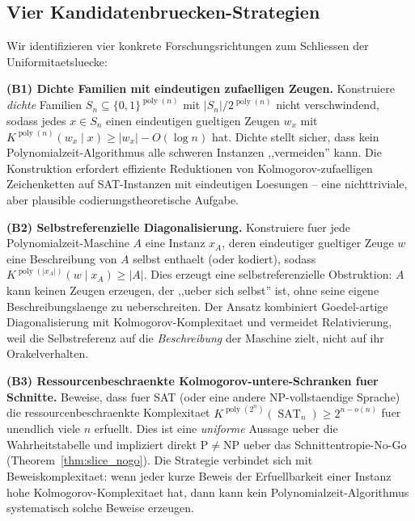 \documentclass[aps,prd,twocolumn,superscriptaddress,nofootinbib]{revtex4-2}
\theoremstyle{definition}
\theoremstyle{remark}
\DeclareMathOperator{\poly}{poly}
\DeclareMathOperator{\SAT}{SAT}
\newcommand{\NP}{\mathrm{NP}}
\newcommand{\PP}{\mathrm{P}}
\begin{document}
\subsection{Vier Kandidatenbruecken-Strategien}

Wir identifizieren vier konkrete Forschungsrichtungen zum Schliessen der Uniformitaetsluecke:

\textbf{(B1) Dichte Familien mit eindeutigen zufaelligen Zeugen.} Konstruiere \textit{dichte} Familien $S_n \subseteq \{0,1\}^{\poly(n)}$ mit $|S_n|/2^{\poly(n)}$ nicht verschwindend, sodass jedes $x \in S_n$ einen eindeutigen gueltigen Zeugen $w_x$ mit $K^{\poly(n)}(w_x \mid x) \geq |w_x| - O(\log n)$ hat. Dichte stellt sicher, dass kein Polynomialzeit-Algorithmus alle schweren Instanzen ,,vermeiden'' kann. Die Konstruktion erfordert effiziente Reduktionen von Kolmogorov-zufaelligen Zeichenketten auf SAT-Instanzen mit eindeutigen Loesungen -- eine nichttriviale, aber plausible codierungstheoretische Aufgabe.

\textbf{(B2) Selbstreferenzielle Diagonalisierung.} Konstruiere fuer jede Polynomialzeit-Maschine $A$ eine Instanz $x_A$, deren eindeutiger gueltiger Zeuge $w$ eine Beschreibung von $A$ selbst enthaelt (oder kodiert), sodass $K^{\poly(|x_A|)}(w \mid x_A) \geq |A|$. Dies erzeugt eine selbstreferenzielle Obstruktion: $A$ kann keinen Zeugen erzeugen, der ,,ueber sich selbst'' ist, ohne seine eigene Beschreibungslaenge zu ueberschreiten. Der Ansatz kombiniert Goedel-artige Diagonalisierung mit Kolmogorov-Komplexitaet und vermeidet Relativierung, weil die Selbstreferenz auf die \textit{Beschreibung} der Maschine zielt, nicht auf ihr Orakelverhalten.

\textbf{(B3) Ressourcenbeschraenkte Kolmogorov-untere-Schranken fuer Schnitte.} Beweise, dass fuer SAT (oder eine andere NP-vollstaendige Sprache) die ressourcenbeschraenkte Komplexitaet $K^{\poly(2^n)}(\SAT_n) \geq 2^{n-o(n)}$ fuer unendlich viele $n$ erfuellt. Dies ist eine \textit{uniforme} Aussage ueber die Wahrheitstabelle und impliziert direkt $\PP \neq \NP$ ueber das Schnittentropie-No-Go (Theorem~\ref{thm:slice_nogo}). Die Strategie verbindet sich mit Beweiskomplexitaet: wenn jeder kurze Beweis der Erfuellbarkeit einer Instanz hohe Kolmogorov-Komplexitaet hat, dann kann kein Polynomialzeit-Algorithmus systematisch solche Beweise erzeugen.
\end{document}
